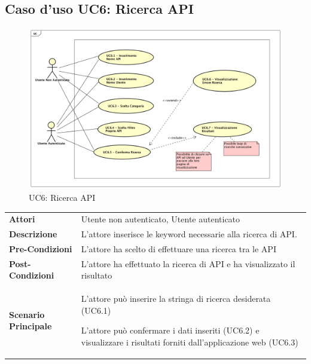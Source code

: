 \newpage
\subsection{Caso d'uso UC6: Ricerca API}
\label{UC6}
\begin{figure}[ht]
	\centering
	\includegraphics[scale=0.45]{UML/UC6.png}
	\caption{UC6: Ricerca API}
\end{figure}

\begin{longtable}{ l | p{11cm}}
	\hline
	\rowcolor{Gray}
	 \multicolumn{2}{c}{UC6 - Ricerca API} \\
	 \hline
	\textbf{Attori} & Utente non autenticato, Utente autenticato \\
	\textbf{Descrizione} & L'attore inserisce le keyword necessarie alla ricerca di API. \\
	\textbf{Pre-Condizioni} & L'attore ha scelto di effettuare una ricerca tra le API \\
	\textbf{Post-Condizioni} & L'attore ha effettuato la ricerca di API e ha visualizzato il risultato\\
	\textbf{Scenario Principale} & 
	\begin{enumerate*}[label=(\arabic*.),itemjoin={\newline}]
		\item L'attore può inserire la stringa di ricerca desiderata (UC6.1)
		\item L'attore può confermare i dati inseriti (UC6.2) e visualizzare i risultati forniti dall'applicazione web (UC6.3)
	\end{enumerate*}\\
\end{longtable}